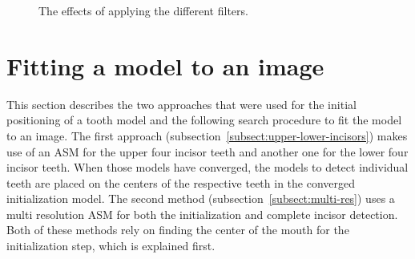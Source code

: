 \documentclass[a4paper]{article}
\begin{document}
\begin{figure}[H]
    \qquad
    \caption{The effects of applying the different filters.}
  \label{fig:preprocessing}
\end{figure}



\section{Fitting a model to an image}
\label{sect:init-estimate}
This section describes the two approaches that were used for the initial positioning of a tooth model and the following search procedure to fit the model to an image.
The first approach (subsection~\ref{subsect:upper-lower-incisors}) makes use of an ASM for the upper four incisor teeth and another one for the lower four incisor teeth.
When those models have converged, the models to detect individual teeth are placed on the centers of the respective teeth in the converged initialization model.
The second method (subsection~\ref{subsect:multi-res}) uses a multi resolution ASM for both the initialization and complete incisor detection.
Both of these methods rely on finding the center of the mouth for the initialization step, which is explained first.
\end{document}
